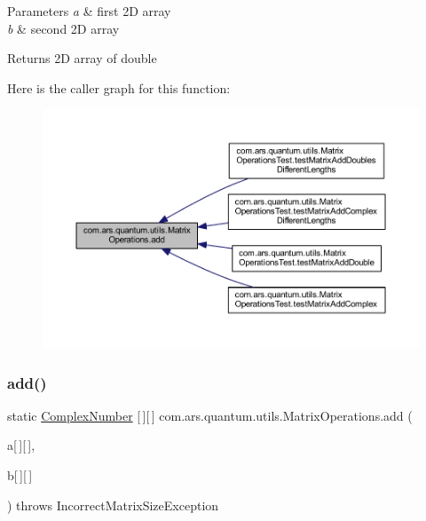 \begin{DoxyParams}{Parameters}
{\em a} & first 2D array \\
\hline
{\em b} & second 2D array \\
\hline
\end{DoxyParams}
\begin{DoxyReturn}{Returns}
2D array of double 
\end{DoxyReturn}
Here is the caller graph for this function\+:\nopagebreak
\begin{figure}[H]
\begin{center}
\leavevmode
\includegraphics[width=350pt]{classcom_1_1ars_1_1quantum_1_1utils_1_1_matrix_operations_af6e0ec44a13d9a89b249606514378bf8_icgraph}
\end{center}
\end{figure}
\hypertarget{classcom_1_1ars_1_1quantum_1_1utils_1_1_matrix_operations_aa9b253355d52423992f5208ff2d72b15}{}\label{classcom_1_1ars_1_1quantum_1_1utils_1_1_matrix_operations_aa9b253355d52423992f5208ff2d72b15} 
\subsubsection{\texorpdfstring{add()}{add()}\hspace{0.1cm}{\footnotesize\ttfamily [2/2]}}
{\footnotesize\ttfamily static \hyperlink{classcom_1_1ars_1_1complexnumbers_1_1_complex_number}{Complex\+Number} \mbox{[}$\,$\mbox{]}\mbox{[}$\,$\mbox{]} com.\+ars.\+quantum.\+utils.\+Matrix\+Operations.\+add (\begin{DoxyParamCaption}\item[{\hyperlink{classcom_1_1ars_1_1complexnumbers_1_1_complex_number}{Complex\+Number}}]{a\mbox{[}$\,$\mbox{]}\mbox{[}$\,$\mbox{]},  }\item[{\hyperlink{classcom_1_1ars_1_1complexnumbers_1_1_complex_number}{Complex\+Number}}]{b\mbox{[}$\,$\mbox{]}\mbox{[}$\,$\mbox{]} }\end{DoxyParamCaption}) throws Incorrect\+Matrix\+Size\+Exception\hspace{0.3cm}{\ttfamily [static]}}


